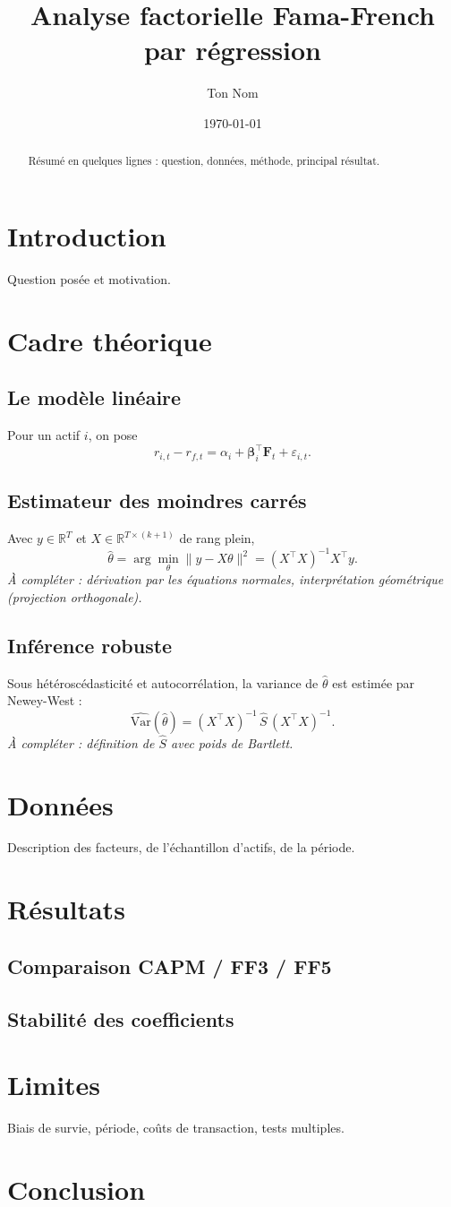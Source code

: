 \documentclass[11pt,a4paper]{article}
\title{Analyse factorielle Fama-French par régression}
\author{Ton Nom}
\date{\today}
\begin{document}
\maketitle

\begin{abstract}
Résumé en quelques lignes : question, données, méthode, principal résultat.
\end{abstract}

\section{Introduction}
Question posée et motivation.

\section{Cadre théorique}
\subsection{Le modèle linéaire}
Pour un actif $i$, on pose
\[
  r_{i,t} - r_{f,t} = \alpha_i + \boldsymbol{\beta}_i^{\top} \mathbf{F}_t + \varepsilon_{i,t}.
\]

\subsection{Estimateur des moindres carrés}
Avec $y \in \mathbb{R}^T$ et $X \in \mathbb{R}^{T \times (k+1)}$ de rang plein,
\[
  \hat{\theta} = \arg\min_{\theta} \lVert y - X\theta \rVert^2 = (X^{\top}X)^{-1}X^{\top}y.
\]
\emph{À compléter : dérivation par les équations normales, interprétation géométrique (projection orthogonale).}

\subsection{Inférence robuste}
Sous hétéroscédasticité et autocorrélation, la variance de $\hat{\theta}$ est estimée par Newey-West :
\[
  \widehat{\mathrm{Var}}(\hat{\theta}) = (X^{\top}X)^{-1}\,\hat{S}\,(X^{\top}X)^{-1}.
\]
\emph{À compléter : définition de $\hat{S}$ avec poids de Bartlett.}

\section{Données}
Description des facteurs, de l'échantillon d'actifs, de la période.

\section{Résultats}
\subsection{Comparaison CAPM / FF3 / FF5}
\subsection{Stabilité des coefficients}

\section{Limites}
Biais de survie, période, coûts de transaction, tests multiples.

\section{Conclusion}
\end{document}

